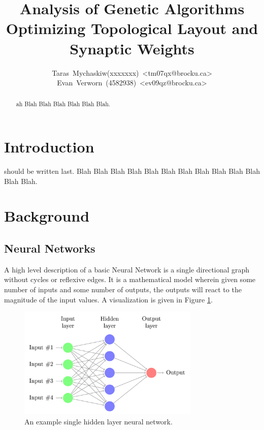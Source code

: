\documentclass[journal]{IEEEtran}
\begin{document}
\title{Analysis of Genetic Algorithms Optimizing Topological Layout and Synaptic Weights }

\author{Taras~Mychaskiw(xxxxxxx)~\textless{}tm07qx@brocku.ca\textgreater\\%
Evan~Verworn~(4582938)~\textless{}ev09qz@brocku.ca\textgreater%
}

\maketitle

\begin{abstract}ah Blah Blah Blah Blah Blah Blah.
\end{abstract}

\IEEEpeerreviewmaketitle

\section{Introduction}
 should be written last. Blah Blah Blah Blah Blah Blah Blah Blah Blah Blah Blah Blah Blah. 

\section{Background}

  \subsection{Neural Networks}
  A high level description of a basic Neural Network is a single directional graph without cycles or reflexive edges. It is a mathematical model wherein given some number of inputs and some number of outputs, the outputs will react to the magnitude of the input values. A visualization is given in Figure \ref{fig:NeuralNetwork}.
  
\begin{figure}[here]%
  \centering
  \includegraphics[width=3.4in]{neural-network}
  \caption{An example single hidden layer neural network.}
  \label{fig:NeuralNetwork}
\end{figure}
\end{document}
